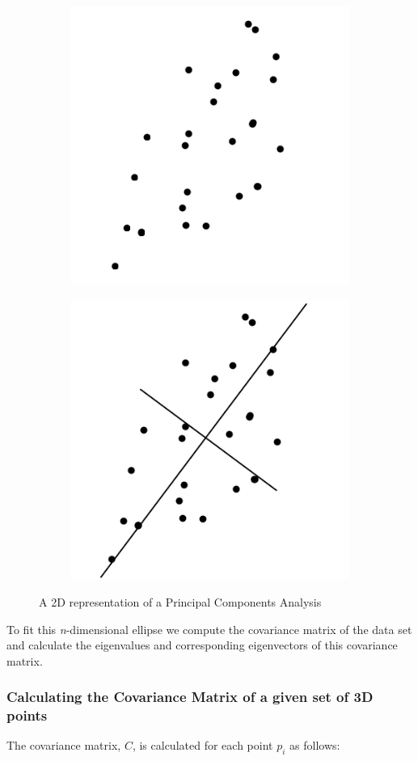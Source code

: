 		\begin{figure}[H]
			\centering
			\begin{subfigure}{.5\textwidth}
				\centering
				\includegraphics[width=0.6\linewidth]{Includes/images/pca1}

				\label{fig:sub1}
			\end{subfigure}%
			\begin{subfigure}{.5\textwidth}
				\centering
				\includegraphics[width=0.6\linewidth]{Includes/images/pca2}

				\label{fig:sub2}
			\end{subfigure}
			\caption{A 2D representation of a Principal Components Analysis }
		\end{figure} 
		
		To fit this \textit{n}-dimensional ellipse we compute the covariance matrix of the data set and calculate the eigenvalues and corresponding eigenvectors of this covariance matrix.
		
		\subsubsection{Calculating the Covariance Matrix of a given set of 3D points}
			The covariance matrix, $C$, is calculated for each point $p_i$ as follows:
			
